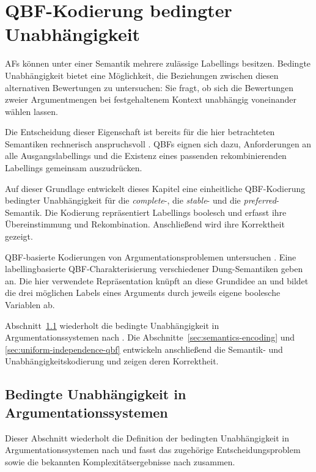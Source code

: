 \chapter{QBF-Kodierung bedingter Unabhängigkeit}
\label{ch:semantic-independence}

AFs können unter einer Semantik mehrere zulässige
Labellings besitzen. Bedingte Unabhängigkeit bietet eine Möglichkeit, die
Beziehungen zwischen diesen alternativen Bewertungen zu untersuchen: Sie
fragt, ob sich die Bewertungen zweier Argumentmengen bei festgehaltenem
Kontext unabhängig voneinander wählen lassen.

Die Entscheidung dieser Eigenschaft ist bereits für die hier betrachteten
Semantiken rechnerisch anspruchsvoll
\parencite{bluemel:2025:independence-aba}. QBFs eignen sich dazu, 
Anforderungen an alle Ausgangslabellings und die
Existenz eines passenden rekombinierenden Labellings gemeinsam
auszudrücken.

Auf dieser Grundlage entwickelt dieses Kapitel eine einheitliche
QBF-Kodierung bedingter Unabhängigkeit für die \emph{complete}-, die
\emph{stable}- und die \emph{preferred}-Semantik. Die Kodierung
repräsentiert Labellings boolesch und erfasst ihre Übereinstimmung und
Rekombination. Anschließend wird ihre Korrektheit gezeigt.

QBF-basierte Kodierungen von Argumentationsproblemen untersuchen
\textcite{egly:woltran:2006:reasoning-qbf}. Eine labellingbasierte
QBF-Charakterisierung verschiedener Dung-Semantiken geben
\textcite{arieli:caminada:2013:qbf-af} an. Die hier verwendete
Repräsentation knüpft an diese Grundidee an und bildet die drei möglichen
Labels eines Arguments durch jeweils eigene boolesche Variablen ab.

Abschnitt~\ref{sec:sigma-independence-af-complexity} wiederholt die
bedingte Unabhängigkeit in Argumentationssystemen nach
\textcite{rienstra:2020:independence-af}. Die
Abschnitte~\ref{sec:semantics-encoding} und
\ref{sec:uniform-independence-qbf} entwickeln anschließend die Semantik-
und Unabhängigkeitskodierung und zeigen deren Korrektheit.
\section{Bedingte Unabhängigkeit in Argumentationssystemen}
\label{sec:sigma-independence-af-complexity}

Dieser Abschnitt wiederholt die Definition der bedingten Unabhängigkeit
in Argumentationssystemen nach
\textcite{rienstra:2020:independence-af} und fasst das zugehörige
Entscheidungsproblem sowie die bekannten Komplexitätsergebnisse nach
\textcite{bluemel:2025:independence-aba} zusammen.

